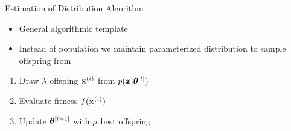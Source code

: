 \documentclass[11pt,compress,t,notes=noshow, xcolor=table]{beamer}
\begin{document}
\begin{frame}{Estimation of Distribution Algorithm}

\begin{minipage}{0.62\textwidth}
\begin{itemize}
    \item General algorithmic template
    \item Instead of population we maintain parameterized distribution to sample offspring from
\end{itemize}

\vspace{0.5cm}
\begin{enumerate}
\item Draw $\lambda$ offsping $\mathbf{x}^{(i)}$ from $p(\bm{x}|\bm{\theta}^{[t]})$
\item Evaluate fitness $f(\mathbf{x}^{(i)})$ 
\item Update $\bm{\theta}^{[t+1]}$ with $\mu$ best offspring 
\end{enumerate}


\end{minipage}
\end{frame}
\end{document}
